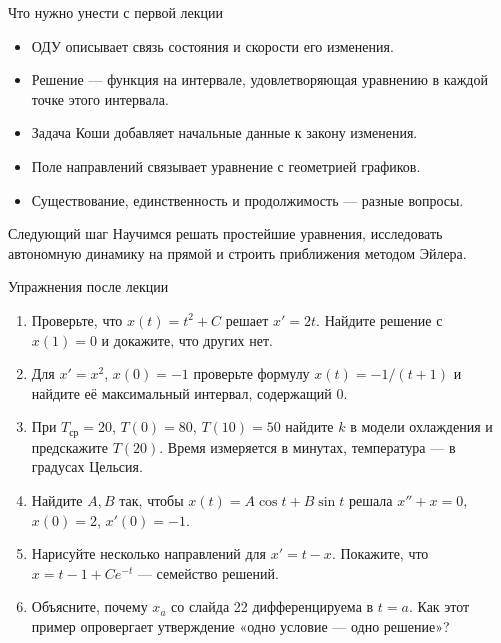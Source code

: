 \documentclass[aspectratio=169,11pt]{beamer}
\begin{document}
\begin{frame}{Что нужно унести с первой лекции}
  \begin{itemize}
    \item ОДУ описывает связь состояния и скорости его изменения.
    \item Решение --- функция на интервале, удовлетворяющая уравнению
      в каждой точке этого интервала.
    \item Задача Коши добавляет начальные данные к закону изменения.
    \item Поле направлений связывает уравнение с геометрией графиков.
    \item Существование, единственность и продолжимость --- разные вопросы.
  \end{itemize}
  \begin{block}{Следующий шаг}
    Научимся решать простейшие уравнения, исследовать автономную динамику
    на прямой и строить приближения методом Эйлера.
  \end{block}
\end{frame}

\begin{frame}{Упражнения после лекции}
  \small
  \begin{enumerate}
    \item Проверьте, что $x(t)=t^2+C$ решает $x'=2t$.
      Найдите решение с $x(1)=0$ и докажите, что других нет.
    \item Для $x'=x^2$, $x(0)=-1$ проверьте формулу
      $x(t)=-1/(t+1)$ и найдите её максимальный интервал, содержащий $0$.
    \item При $T_{\text{ср}}=20$, $T(0)=80$, $T(10)=50$
      найдите $k$ в модели охлаждения и предскажите $T(20)$.
      Время измеряется в минутах, температура --- в градусах Цельсия.
    \item Найдите $A,B$ так, чтобы $x(t)=A\cos t+B\sin t$
      решала $x''+x=0$, $x(0)=2$, $x'(0)=-1$.
    \item Нарисуйте несколько направлений для $x'=t-x$.
      Покажите, что $x=t-1+Ce^{-t}$ --- семейство решений.
    \item Объясните, почему $x_a$ со слайда 22 дифференцируема в $t=a$.
      Как этот пример опровергает утверждение «одно условие --- одно решение»?
  \end{enumerate}
\end{frame}
\end{document}
